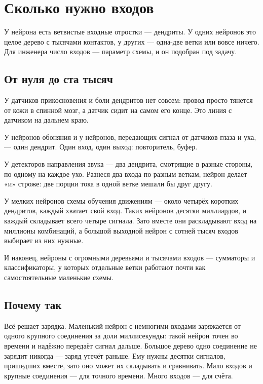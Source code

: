 \chapter{Сколько нужно входов}

У нейрона есть ветвистые входные отростки --- дендриты. У одних нейронов это целое дерево с тысячами контактов, у других --- одна-две ветки или вовсе ничего. Для инженера число входов --- параметр схемы, и он подобран под задачу.

\section*{От нуля до ста тысяч}

У датчиков прикосновения и боли дендритов нет совсем: провод просто тянется от кожи в спинной мозг, а датчик сидит на самом его конце. Это линия с датчиком на дальнем краю.


У нейронов обоняния и у нейронов, передающих сигнал от датчиков глаза и уха, --- один дендрит. Один вход, один выход: повторитель, буфер.

У детекторов направления звука --- два дендрита, смотрящие в разные стороны, по одному на каждое ухо. Разнеся два входа по разным веткам, нейрон делает «и» строже: две порции тока в одной ветке мешали бы друг другу.

У мелких нейронов схемы обучения движениям --- около четырёх коротких дендритов, каждый хватает свой вход. Таких нейронов десятки миллиардов, и каждый складывает всего четыре сигнала. Зато вместе они раскладывают вход на миллионы комбинаций, а большой выходной нейрон с сотней тысяч входов выбирает из них нужные.

И наконец, нейроны с огромными деревьями и тысячами входов --- сумматоры и классификаторы, у которых отдельные ветки работают почти как самостоятельные маленькие схемы.

\section*{Почему так}

Всё решает зарядка. Маленький нейрон с немногими входами заряжается от одного крупного соединения за доли миллисекунды: такой нейрон точен во времени и надёжно передаёт сигнал дальше. Большое дерево одно соединение не зарядит никогда --- заряд утечёт раньше. Ему нужны десятки сигналов, пришедших вместе, зато оно может их складывать и сравнивать. Мало входов и крупные соединения --- для точного времени. Много входов --- для счёта.

